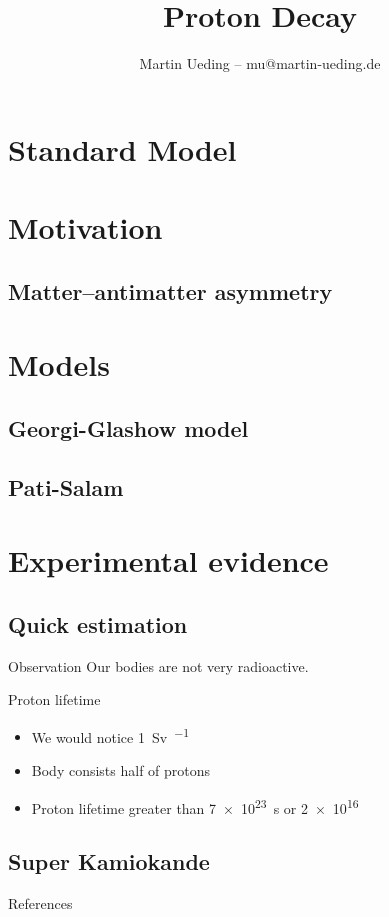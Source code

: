 \documentclass[english, fleqn]{beamer}
\title{Proton Decay}
\author{Martin Ueding -- mu@martin-ueding.de}
\begin{document}
\begin{frame}
    \titlepage
\end{frame}

\section{Standard Model}

\section{Motivation}

\subsection{Matter--antimatter asymmetry}

\section{Models}

\subsection{Georgi-Glashow model}

\subsection{Pati-Salam}

\begin{frame}
    \parencite{Wu/Proton_decay}
\end{frame}

\section{Experimental evidence}

\subsection{Quick estimation}

\begin{frame}
    \begin{block}{Observation}
        Our bodies are not very radioactive.
    \end{block}

    \pause

    \begin{block}{Proton lifetime}
        \begin{itemize}
            \item We would notice \SI{1}{\sievert\per\year}
            \item Body consists half of protons
            \item Proton lifetime greater than \SI{7e23}{\second} or \SI{2e16}{\year}
        \end{itemize}
    \end{block}

    \nocite{wikipedia/groessenordnung-aequivalentdosis}
\end{frame}

\subsection{Super Kamiokande}

\begin{frame}
    References

    \printbibliography
\end{frame}
\end{document}
